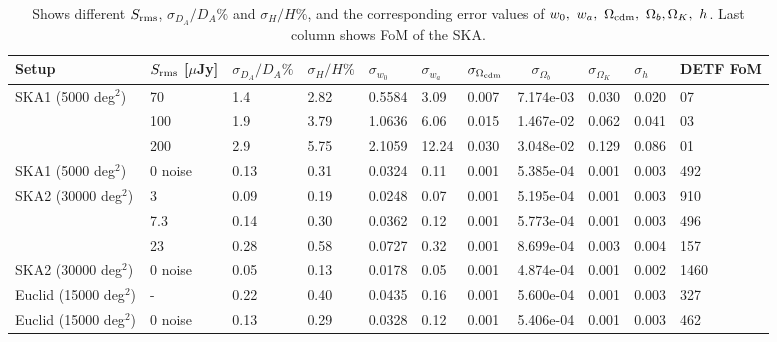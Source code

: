 \documentclass[useAMS,usenatbib]{mn2e}
\begin{document}
\begin{table}
\caption{Shows different $S_{\rm rms}$, $\sigma_{D_A}/{D_A} \%$ and $\sigma_{H}/H \%$, and  the corresponding error values of $w_0, \  w_a, \ \Omega_{{\rm cdm}}, \ \Omega_b,\Omega_K,\  h$. Last column shows FoM of the SKA.}
\begin{tabular}{ |l|l|l|l|l|l||l||l|l|l|l|}
\hline
\hline 
\multirow{1}{*}{Setup}& $S_{\rm rms}$  [$\mu$Jy]  & $\sigma_{D_A}/{D_A} \%$ & $\sigma_{H}/H \%$ & $\sigma_{w_0}$ &  $\sigma_{w_a}$ &  $\sigma_{\Omega_{{\rm cdm}}} $ & $\quad \sigma_{\Omega_b}$ & $ \sigma_{\Omega_K} $ & $\sigma_{h}$ & DETF FoM \\
\hline
\multirow{1}{*}{SKA1 (5000 deg$^2$)}
  & 70  & 1.4& 2.82 & 0.5584 & 3.09 & 0.007 & 7.174e-03 & 0.030 & 0.020 & 07  \\
 & 100 & 1.9&3.79 & 1.0636 & 6.06 & 0.015 & 1.467e-02 & 0.062 & 0.041 & 03  \\
  & 200 & 2.9 & 5.75  & 2.1059 & 12.24 & 0.030 & 3.048e-02 & 0.129 & 0.086 & 01  \\
\hline
\hline
\multirow{1}{*}{SKA1 (5000 deg$^2$)}
  & 0 noise &0.13 & 0.31 & 0.0324 & 0.11 & 0.001 & 5.385e-04 & 0.001 & 0.003 & 492  \\
\hline
\multirow{3}{*}{SKA2 (30000 deg$^2$)}
  & 3 &0.09 & 0.19 & 0.0248 & 0.07 & 0.001 & 5.195e-04 & 0.001 & 0.003 & 910  \\
   &7.3& 0.14 & 0.30 & 0.0362 & 0.12 & 0.001 & 5.773e-04 & 0.001 & 0.003 & 496  \\
  & 23 &0.28 & 0.58 & 0.0727 & 0.32 & 0.001 & 8.699e-04 & 0.003 & 0.004 & 157  \\
  \hline
  \hline
\multirow{1}{*}{SKA2 (30000 deg$^2$)}
 & 0 noise & 0.05& 0.13 & 0.0178 & 0.05 & 0.001 & 4.874e-04 & 0.001 & 0.002 & 1460  \\

  \hline

\multirow{1}{*}{Euclid (15000 deg$^2$)}
 & -  &0.22 & 0.40 & 0.0435 & 0.16 & 0.001 & 5.600e-04 & 0.001 & 0.003 & 327  \\
\hline
\hline
\multirow{1}{*}{Euclid (15000 deg$^2$)}
 & 0 noise  &0.13 &0.29  & 0.0328 & 0.12 & 0.001 & 5.406e-04 & 0.001 & 0.003 & 462  \\
\hline
\end{tabular}
\label{Table1:summary-wa-w0_all}
\end{table}
\end{document}
